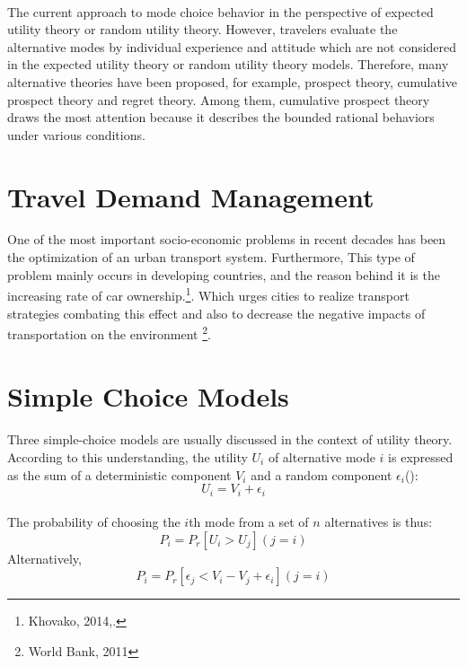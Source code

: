


\paragraph{}The current approach to mode choice behavior
in the perspective of expected utility theory or random utility theory. However, travelers evaluate the alternative modes by individual experience and attitude which are not considered in the expected utility theory or random utility theory models. Therefore, many alternative theories have been proposed, for example, prospect theory, cumulative prospect theory and regret theory. Among them, cumulative prospect theory draws the most attention because it describes the bounded rational behaviors under various conditions.

\clearpage

\section{Travel Demand Management}
One of the most important socio-economic problems in recent decades has been the optimization of an urban transport system. Furthermore, This type of problem mainly occurs in developing countries, and the reason behind it is the increasing rate of car ownership.\footnote{Khovako, 2014,.}. Which urges cities to realize transport strategies combating this effect and also to decrease the negative impacts of transportation on the environment \footnote{World Bank, 2011}.
\section{Simple Choice Models}
\paragraph{}Three simple-choice models are usually discussed in the context of utility theory. According to this understanding, the utility $U_i$ of alternative mode $i$ is expressed as the sum of a deterministic component $V_i$ and a random component $\epsilon_i$(\cite{Richard, David, 1982}):
\begin{equation}
U_i = V_i + \epsilon_i
\end{equation}
\paragraph{} The probability of choosing the $i$th mode from a set of $n$ alternatives is thus:
\begin{equation}
P_i = P_r[U_i>U_j](j=i)
\end{equation}
Alternatively, 
\begin{equation}\label{eq:3}
P_i = P_r[\epsilon_j < V_i - V_j + \epsilon_i](j=i)
\end{equation}
